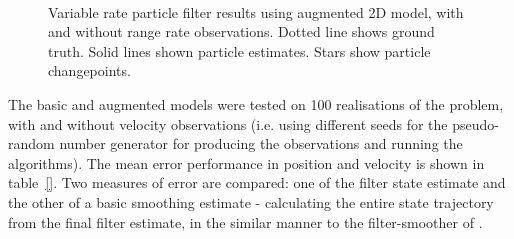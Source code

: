 \documentclass[conference]{IEEEtran}
\begin{document}
\begin{figure}
\centering
{}
\\
\caption{Variable rate particle filter results using augmented 2D model, with and without range rate observations. Dotted line shows ground truth. Solid lines shown particle estimates. Stars show particle changepoints.}
\label{fig:2D_Model2}
\end{figure}

The basic and augmented models were tested on 100 realisations of the problem, with and without velocity observations (i.e. using different seeds for the pseudo-random number generator for producing the observations and running the algorithms). The mean error performance in position and velocity is shown in table~\ref{}. Two measures of error are compared: one of the filter state estimate and the other of a basic smoothing estimate - calculating the entire state trajectory from the final filter estimate, in the similar manner to the filter-smoother of \cite{Kitagawa1996}.
\end{document}
